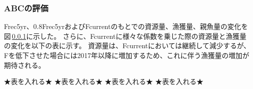 \subsubsection{ABCの評価}
Frec5yr、0.8Frec5yrおよびFcurrentのもとでの資源量、漁獲量、親魚量の変化を図\,\ref{}に示した。
さらに、Fcurrentに様々な係数を乗じた際の資源量と漁獲量の変化を以下の表に示す。
資源量は、Fcurrentにおいては継続して減少するが、Fを低下させた場合には2017年以降に増加するため、これに伴う漁獲量の増加が期待される。

★表を入れる★
★表を入れる★
★表を入れる★
★表を入れる★
